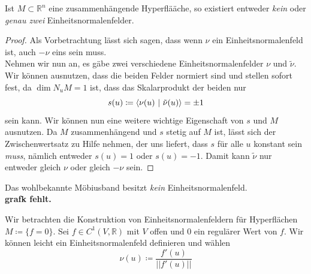 \begin{lemma}
Ist $M\subset\mathbb{R}^n$ eine zusammenhängende Hyperflääche, so existiert entweder \emph{kein} oder \emph{genau zwei} Einheitsnormalenfelder. 
\end{lemma}

\begin{proof}
Als Vorbetrachtung lässt sich sagen, dass wenn $\nu$ ein Einheitsnormalenfeld ist, auch $-\nu$ eins sein muss.\\
Nehmen wir nun an, es gäbe zwei verschiedene Einheitsnormalenfelder $\nu$ und $\tilde{\nu}$. 
Wir können ausnutzen, dass die beiden Felder normiert sind und stellen sofort fest, da $\dim N_uM=1$ ist, dass das Skalarprodukt der beiden nur
\begin{equation*}
s(u)\coloneqq\left\langle \nu(u) \ \middle| \ \tilde{\nu}(u)\right\rangle=\pm 1
\end{equation*}
sein kann. Wir können nun eine weitere wichtige Eigenschaft von $s$ und $M$ ausnutzen.
Da $M$ zusammenhängend und $s$ stetig auf $M$ ist, lässt sich der Zwischenwertsatz zu Hilfe nehmen, 
der uns liefert, dass $s$ für alle $u$ konstant sein \emph{muss}, nämlich entweder $s(u)=1$ oder $s(u)=-1$.
Damit kann $\tilde{\nu}$ nur entweder gleich $\nu$ oder gleich $-\nu$ sein.
\end{proof}

\begin{beispiel}[Möbiusband]
Das wohlbekannte Möbiusband besitzt \emph{kein} Einheitsnormalenfeld.\\
\textbf{grafk fehlt.} 
\end{beispiel}

\begin{beispiel}
Wir betrachten die Konstruktion von Einheitsnormalenfeldern für Hyperflächen $M\coloneqq \{f=0\}$.
Sei $f\in C^1\left(V,\mathbb{R}\right)$ mit $V$ offen und $0$ ein regulärer Wert von $f$. 
Wir können leicht ein Einheitsnormalenfeld definieren und wählen
\begin{equation*}
\nu(u)\coloneqq\frac{f'(u)}{||f'(u)||}
\end{equation*}
\end{beispiel}

